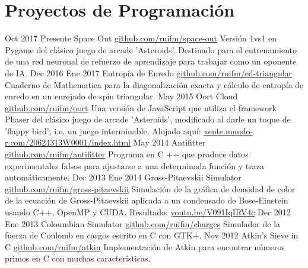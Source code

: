 \documentclass[letterpaper]{twentysecondcv} %
\begin{document}
\section{Proyectos de Programación}

\begin{twenty} %
    \twentyitem
        {Oct 2017}
        {Presente}
        {Space Out}
        {\href{https://github.com/ruifm/space-out}{\faGithub github.com/ruifm/space-out}}
        {}
        {Versión 1vs1 en Pygame del clásico juego de arcade 'Asteroids'. Destinado para el entrenamiento de una red neuronal de refuerzo de aprendizaje para trabajar como un oponente de IA.}
    \twentyitem
        {Dec 2016}
        {Ene 2017}
        {Entropía de Enredo}
        {\href{https://github.com/ruifm/ed-triangular}{\faGithub github.com/ruifm/ed-triangular}}
        {}
        {Cuaderno de Mathematica para la diagonalización exacta y cálculo de entropía de enredo en un enrejado de spin triangular.}
    \twentyitem
        {May 2015}
        {}
        {Oort Cloud}
        {\href{https://github.com/ruifm/oort}{\faGithub github.com/ruifm/oort}}
        {}
        {Una versión de JavaScript que utiliza el framework Phaser del clásico juego de arcade 'Asteroids', modificado al darle un toque de 'flappy bird', i.e. un juego interminable. Alojado aquí: \href{www.xente.mundo-r.com/20624313W0001/index.html}{xente.mundo-r.com/20624313W0001/index.html}}
    \twentyitem
        {May 2014}
        {}
        {Antifitter}
        {\href{https://github.com/ruifm/antifitter}{\faGithub github.com/ruifm/antifitter}}
        {}
        {Programa en C ++ que produce datos experimentales falsos para ajustarse a una determinada función y traza automáticamente.}
     \twentyitem
        {Dec 2013}
        {Ene 2014}
        {Gross-Pitaevskii Simulator}
        {\href{https://github.com/ruifm/gross-pitaevskii}{\faGithub github.com/ruifm/gross-pitaevskii}}
        {}
        {Simulación de la gráfica de densidad de color de la ecuación de Gross-Pitaevskii aplicada a un condensado de Bose-Einstein usando C++, OpenMP y CUDA. Resultado: \href{https://youtu.be/V091IqIRV4c}{youtu.be/V091IqIRV4c}}
    \twentyitem
        {Dec 2012}
        {Ene 2013}
        {Coloumbian Simulator}
        {\href{https://github.com/ruifm/charges}{\faGithub github.com/ruifm/charges}}
        {}
        {Simulador de la fuerza de Coulomb en cargos escrito en C con GTK+.}
    \twentyitem
        {Nov 2012}
        {}
        {Atkin's Sieve in C}
        {\href{https://github.com/ruifm/atkin}{\faGithub github.com/ruifm/atkin}}
        {}
        {Implementación de Atkin para encontrar números primos en C con muchas características.}       
\end{twenty}
\end{document}
